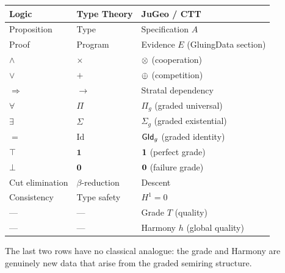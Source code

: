 \begin{center}
\renewcommand{\arraystretch}{1.2}
\begin{tabular}{lll}
\textbf{Logic} & \textbf{Type Theory} & \textbf{JuGeo / CTT} \\
\hline
Proposition & Type & Specification $A$ \\
Proof & Program & Evidence $E$ (GluingData section) \\
$\wedge$ & $\times$ & $\otimes$ (cooperation) \\
$\vee$ & $+$ & $\oplus$ (competition) \\
$\Rightarrow$ & $\to$ & Stratal dependency \\
$\forall$ & $\Pi$ & $\Pi_g$ (graded universal) \\
$\exists$ & $\Sigma$ & $\Sigma_g$ (graded existential) \\
$=$ & $\mathrm{Id}$ & $\mathsf{GId}_g$ (graded identity) \\
$\top$ & $\mathbf{1}$ & $\mathbf{1}$ (perfect grade) \\
$\bot$ & $\mathbf{0}$ & $\mathbf{0}$ (failure grade) \\
Cut elimination & $\beta$-reduction & Descent \\
Consistency & Type safety & $H^1 = 0$ \\
--- & --- & Grade $T$ (quality) \\
--- & --- & Harmony $h$ (global quality) \\
\end{tabular}
\end{center}

The last two rows have no classical analogue: the grade and Harmony
are genuinely new data that arise from the graded semiring structure.


